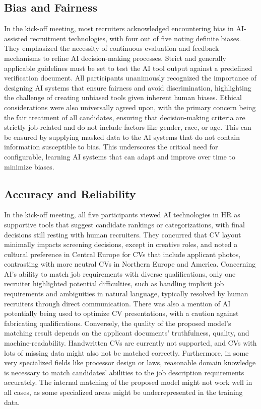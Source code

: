 \documentclass[draft,final]{thesisclass} %
\begin{document}
\subsection{Bias and Fairness}
In the kick-off meeting, most recruiters acknowledged encountering bias in \acs{AI}-assisted recruitment technologies, with four out of five noting definite biases. They emphasized the necessity of continuous evaluation and feedback mechanisms to refine \acs{AI} decision-making processes. Strict and generally applicable guidelines must be set to test the \acs{AI} tool output against a predefined verification document. All participants unanimously recognized the importance of designing \acs{AI} systems that ensure fairness and avoid discrimination, highlighting the challenge of creating unbiased tools given inherent human biases. Ethical considerations were also universally agreed upon, with the primary concern being the fair treatment of all candidates, ensuring that decision-making criteria are strictly job-related and do not include factors like gender, race, or age. This can be ensured by supplying masked data to the \acs{AI} systems that do not contain information susceptible to bias. This underscores the critical need for configurable, learning \acs{AI} systems that can adapt and improve over time to minimize biases.

\subsection{Accuracy and Reliability}
In the kick-off meeting, all five participants viewed \acs{AI} technologies in \acs{HR} as supportive tools that suggest candidate rankings or categorizations, with final decisions still resting with human recruiters. They concurred that \acs{CV} layout minimally impacts screening decisions, except in creative roles, and noted a cultural preference in Central Europe for \acs{CV}s that include applicant photos, contrasting with more neutral \acs{CV}s in Northern Europe and America. Concerning \acs{AI}'s ability to match job requirements with diverse qualifications, only one recruiter highlighted potential difficulties, such as handling implicit job requirements and ambiguities in natural language, typically resolved by human recruiters through direct communication. There was also a mention of \acs{AI} potentially being used to optimize \acs{CV} presentations, with a caution against fabricating qualifications. Conversely, the quality of the proposed model's matching result depends on the applicant documents' truthfulness, quality, and machine-readability. Handwritten \acs{CV}s are currently not supported, and \acs{CV}s with lots of missing data might also not be matched correctly. Furthermore, in some very specialized fields like processor design or laws, reasonable domain knowledge is necessary to match candidates' abilities to the job description requirements accurately. The internal matching of the proposed model might not work well in all cases, as some specialized areas might be underrepresented in the training data.
\end{document}
